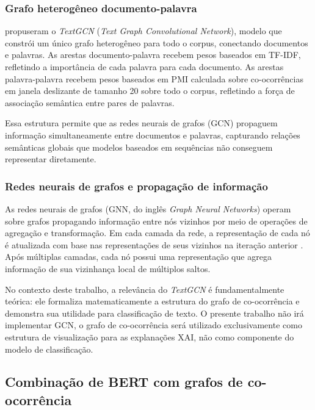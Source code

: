 \documentclass[
    12pt,                %
    openright,           %
    oneside,             %
    a4paper,             %
    english,             %
    brazil               %
]{abntex2}
\begin{document}
\subsubsection{Grafo heterogêneo documento-palavra}
\label{subsubsec:textgcn_grafo}

 propuseram o \textit{TextGCN} (\textit{Text Graph Convolutional Network}), modelo que constrói um único grafo heterogêneo para todo o corpus, conectando documentos e palavras. As arestas documento-palavra recebem pesos baseados em TF-IDF, refletindo a importância de cada palavra para cada documento. As arestas palavra-palavra recebem pesos baseados em PMI calculada sobre co-ocorrências em janela deslizante de tamanho 20 sobre todo o corpus, refletindo a força de associação semântica entre pares de palavras.

Essa estrutura permite que as redes neurais de grafos (GCN) propaguem informação simultaneamente entre documentos e palavras, capturando relações semânticas globais que modelos baseados em sequências não conseguem representar diretamente.

\subsubsection{Redes neurais de grafos e propagação de informação}
\label{subsubsec:textgcn_gcn}

As redes neurais de grafos (GNN, do inglês \textit{Graph Neural Networks}) operam sobre grafos propagando informação entre nós vizinhos por meio de operações de agregação e transformação. Em cada camada da rede, a representação de cada nó é atualizada com base nas representações de seus vizinhos na iteração anterior \cite{yao2019}. Após múltiplas camadas, cada nó possui uma representação que agrega informação de sua vizinhança local de múltiplos saltos.

No contexto deste trabalho, a relevância do \textit{TextGCN} é fundamentalmente teórica: ele formaliza matematicamente a estrutura do grafo de co-ocorrência e demonstra sua utilidade para classificação de texto. O presente trabalho não irá implementar GCN, o grafo de co-ocorrência será utilizado exclusivamente como estrutura de visualização para as explanações XAI, não como componente do modelo de classificação.

\subsection{Combinação de BERT com grafos de co-ocorrência}
\label{subsec:bert_grafo}
\end{document}
